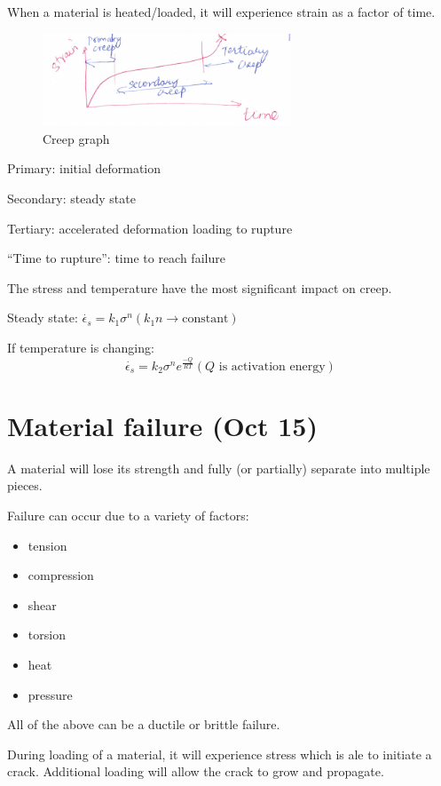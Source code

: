 \documentclass{article}
\begin{document}
When a material is heated/loaded, it will experience strain as a factor of time.

\begin{figure}[h!]
	\centering
	\includegraphics[width=0.66\textwidth]{assets/896dccb9.png}
	\caption{Creep graph}
\end{figure}

Primary: initial deformation

Secondary: steady state

Tertiary: accelerated deformation loading to rupture

``Time to rupture'': time to reach failure

The stress and temperature have the most significant impact on creep.

Steady state: $\dot{\epsilon_s} = k_1 \sigma^n (k_1 n \rightarrow \text{constant})$

If temperature is changing:
\begin{equation*}
    \dot{\epsilon_s} = k_2 \sigma^n e^{\frac{-Q}{RT}} (Q \text{ is activation energy})
\end{equation*}

\section{Material failure (Oct 15)}

A material will lose its strength and fully (or partially) separate into multiple pieces.

Failure can occur due to a variety of factors:
\begin{itemize}
    \item tension
    \item compression
    \item shear
    \item torsion
    \item heat
    \item pressure
\end{itemize}
All of the above can be a ductile or brittle failure.

During loading of a material, it will experience stress which is ale to initiate a crack. Additional loading will allow the crack to grow and propagate.
\end{document}
